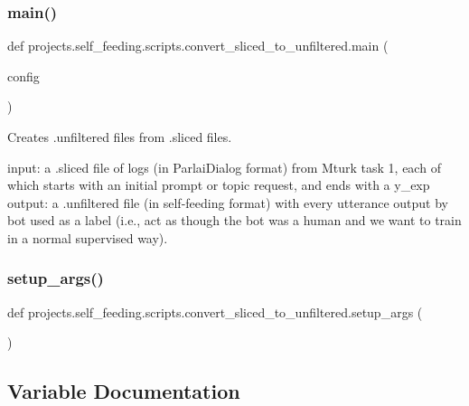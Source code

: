 \subsubsection{\texorpdfstring{main()}{main()}}
{\footnotesize\ttfamily def projects.\+self\+\_\+feeding.\+scripts.\+convert\+\_\+sliced\+\_\+to\+\_\+unfiltered.\+main (\begin{DoxyParamCaption}\item[{}]{config }\end{DoxyParamCaption})}

\begin{DoxyVerb}Creates .unfiltered files from .sliced files.

input: a .sliced file of logs (in ParlaiDialog format) from Mturk task 1, each of
    which starts with an initial prompt or topic request, and ends with a y_exp
output: a .unfiltered file (in self-feeding format) with every utterance output by
    bot used as a label (i.e., act as though the bot was a human and we want to
    train in a normal supervised way).
\end{DoxyVerb}
 \mbox{\label{namespaceprojects_1_1self__feeding_1_1scripts_1_1convert__sliced__to__unfiltered_a13c1e69c48c191e9cc6f8d257b79152d}} 
\subsubsection{\texorpdfstring{setup\+\_\+args()}{setup\_args()}}
{\footnotesize\ttfamily def projects.\+self\+\_\+feeding.\+scripts.\+convert\+\_\+sliced\+\_\+to\+\_\+unfiltered.\+setup\+\_\+args (\begin{DoxyParamCaption}{ }\end{DoxyParamCaption})}



\subsection{Variable Documentation}
\mbox{\label{namespaceprojects_1_1self__feeding_1_1scripts_1_1convert__sliced__to__unfiltered_a247e5e15adbd7a8b7c59711e1d7979d3}} 
